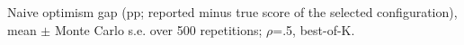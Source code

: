Naive optimism gap (pp; reported minus true score of the selected configuration), mean $\pm$ Monte Carlo s.e. over 500 repetitions; $\rho$=.5, best-of-K.
